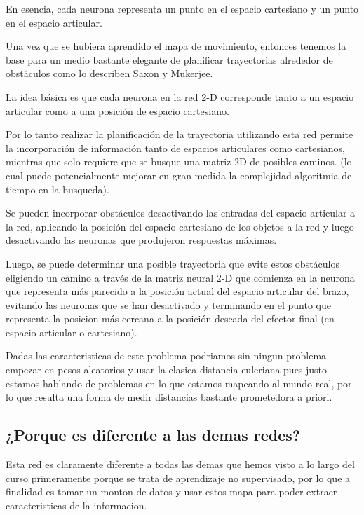 \documentclass[fleqn, journal, onecolumn]{IEEEtran}             %
\theoremstyle{break}                                            %
\begin{document}
      En esencia, cada neurona representa un punto en el espacio cartesiano y 
      un punto en el espacio articular.

      Una vez que se hubiera aprendido el mapa de movimiento, entonces tenemos la base 
      para un medio bastante elegante de planificar trayectorias alrededor de obstáculos 
      como lo describen Saxon y Mukerjee. 
      
      La idea básica es que cada neurona en la red 2-D corresponde tanto a un 
      espacio articular como a una posición de espacio cartesiano. 
      
      Por lo tanto realizar la planificación de la trayectoria utilizando esta red 
      permite la incorporación de información tanto de espacios articulares como cartesianos, 
      mientras que solo requiere que se busque una matriz 2D de posibles caminos. (lo cual
      puede potencialmente mejorar en gran medida la complejidad algoritmia de tiempo 
      en la busqueda).
      
      Se pueden incorporar obstáculos desactivando las entradas del espacio articular a la red, 
      aplicando la posición del espacio cartesiano de los objetos a la red y
      luego desactivando las neuronas que produjeron respuestas máximas. 
      
      Luego, se puede determinar una posible trayectoria que evite estos obstáculos
      eligiendo un camino a través de la matriz neural 2-D que comienza en la neurona
      que representa más parecido a la posición actual del espacio articular del brazo, 
      evitando las neuronas que se han desactivado y terminando en el punto que representa la posicion
      más cercana a la posición deseada del efector final (en espacio articular o cartesiano).

      Dadas las caracteristicas de este problema podriamos sin ningun problema empezar en pesos aleatorios
      y usar la clasica distancia euleriana pues justo estamos hablando de problemas en lo que estamos
      mapeando al mundo real, por lo que resulta una forma de medir distancias bastante prometedora
      a priori.

    \subsection{¿Porque es diferente a las demas redes?}

      Esta red es claramente diferente a todas las demas que hemos visto a lo largo del curso
      primeramente porque se trata de aprendizaje no supervisado, por lo que a finalidad es 
      tomar un monton de datos y usar estos mapa para poder extraer caracteristicas de la informacion.
\end{document}
